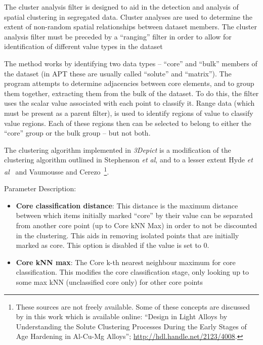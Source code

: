 \documentclass[10pt]{article}
\begin{document}
The cluster analysis filter is designed to aid in the detection and analysis of spatial clustering in segregated data. Cluster analyses are used to determine the extent of non-random spatial relationships between dataset members. The cluster analysis filter must be preceded by a ``ranging'' filter in order to allow for identification of different value types in the dataset

The method works by identifying two data types -- ``core'' and ``bulk'' members of the dataset (in APT these are usually called ``solute'' and ``matrix''). The program attempts to determine adjacencies between core elements, and to group them together, extracting them from the bulk of the dataset. To do this, the filter uses the scalar value associated with each point to classify it. Range data (which must be present as a parent filter), is used to identify regions of value to classify value regions. Each of these regions then can be selected to belong to either the ``core'' group or the bulk group -- but not both.

The clustering algorithm implemented in \emph{3Depict} is a modification of the clustering algorithm outlined in Stephenson \emph{et al}\cite{Stephenson07}, and to a lesser extent Hyde \emph{et al}~\cite{Hyde10} and Vaumousse and Cerezo~\cite{Vaumousse03}\footnote{These sources are not freely available. Some of these concepts are discussed by in this work which is available online: ``Design in Light Alloys by Understanding the Solute Clustering Processes During the Early Stages of Age Hardening in Al-Cu-Mg Alloys''; \url{http://hdl.handle.net/2123/4008}.}.  


Parameter Description:
\begin{itemize}
 \item \textbf{Core classification distance}: This distance is the maximum distance between which items initially marked ``core'' by their value can be separated from another core point (up to Core kNN Max) in order to not be discounted in the clustering. This aids in removing isolated points that are initially marked as core. This option is disabled if the value is set to 0.
 \item \textbf{Core kNN max}: The Core k-th nearest neighbour maximum for core classification. This modifies the core classification stage, only looking up to some max kNN (unclassified core only) for other core points
\end{itemize}
\end{document}
